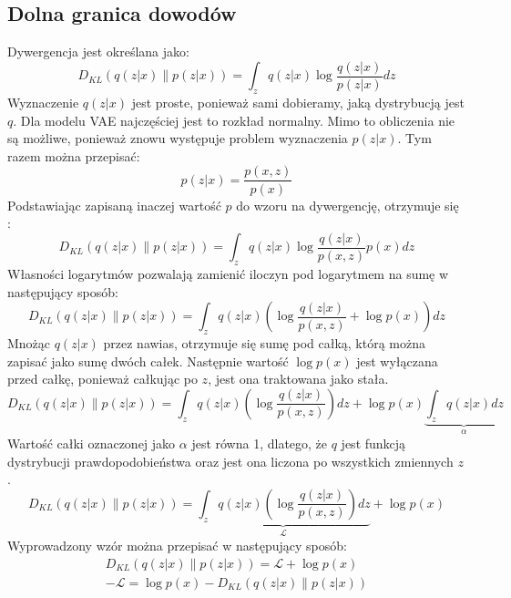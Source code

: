 \documentclass[a4paper,12pt,oneside]{book} %
\begin{document}
\subsection{Dolna granica dowodów}
Dywergencja jest określana jako:
\begin{equation}
	D_{KL}(q(z|x)\|p(z|x))=\displaystyle\int_{z}^{}q(z|x)\log\frac{q(z|x)}{p(z|x)}dz
	\label{kld1}
\end{equation}
Wyznaczenie $q(z|x)$ jest proste, ponieważ sami dobieramy, jaką dystrybucją jest $q$. Dla modelu VAE najczęściej jest to rozkład normalny. Mimo to obliczenia nie są możliwe, ponieważ znowu występuje problem wyznaczenia $p(z|x)$. Tym razem można przepisać:
\begin{equation}
	p(z|x)=\dfrac{p(x,z)}{p(x)}
	\label{bayesinaczej}
\end{equation}
Podstawiając zapisaną inaczej wartość $p$ do wzoru na dywergencję, otrzymuje się \cite{filmik1}:
\begin{equation}
	D_{KL}(q(z|x)\|p(z|x))=\displaystyle\int_{z}^{}q(z|x)\log\frac{q(z|x)}{p(x,z)}p(x)dz
	\label{kldlogarytmy}
\end{equation}
Własności logarytmów pozwalają zamienić iloczyn pod logarytmem na sumę w następujący sposób:
\begin{equation}
	D_{KL}(q(z|x)\|p(z|x))=\displaystyle\int_{z}^{}q(z|x)\left( \log\frac{q(z|x)}{p(x,z)} + \log p(x)\right) dz
	\label{kldcalka}
\end{equation}
Mnożąc $q(z|x)$ przez nawias, otrzymuje się sumę pod całką, którą można zapisać jako sumę dwóch całek. Następnie wartość $\log p(x)$ jest wyłączana przed całkę, ponieważ całkując po $z$, jest ona traktowana jako stała.
\begin{equation}
	D_{KL}(q(z|x)\|p(z|x))=\displaystyle\int_{z}^{}q(z|x)\left( \log\frac{q(z|x)}{p(x,z)}\right)dz + \log p(x)\underbrace{\displaystyle\int_{z}^{}q(z|x)dz}_{\text{$\alpha$}}
	\label{calkaalpha}
\end{equation}
Wartość całki oznaczonej jako $\alpha$ jest równa 1, dlatego, że $q$ jest funkcją dystrybucji prawdopodobieństwa oraz jest ona liczona po wszystkich zmiennych $z$.
\begin{equation}
	D_{KL}(q(z|x)\|p(z|x))=\underbrace{\displaystyle\int_{z}^{}q(z|x)\left( \log\frac{q(z|x)}{p(x,z)}\right)dz}_{\text{$\mathcal{L}$}} + \log p(x)
	\label{kldfinal}
\end{equation}
Wyprowadzony wzór można przepisać w następujący sposób:
\begin{equation}\label{elbo}
	\begin{array}{rcl}
		D_{KL}(q(z|x)\|p(z|x))= \mathcal{L} + \log p(x)\\[1ex]
	-\mathcal{L} = \log p(x) - D_{KL}(q(z|x)\|p(z|x))
	\end{array}
\end{equation}
\end{document}

